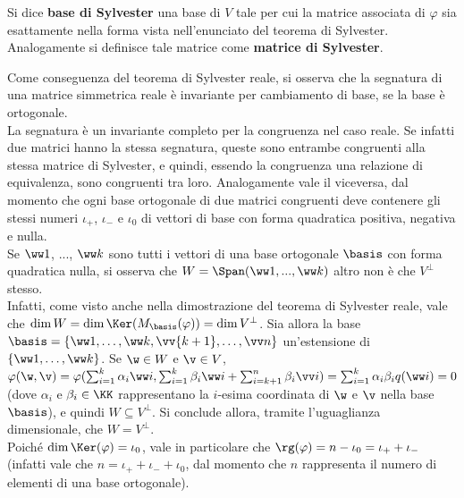 \begin{definition}
	Si dice \textbf{base di Sylvester} una base di $V$ tale per cui la
	matrice associata di $\varphi$ sia esattamente nella forma
	vista nell'enunciato del teorema di Sylvester. Analogamente
	si definisce tale matrice come \textbf{matrice di Sylvester}.
\end{definition}

\begin{remark} \nl
	\li Come conseguenza del teorema di Sylvester reale, si osserva che la segnatura di una matrice simmetrica reale
	è invariante per cambiamento di base, se la base è ortogonale. \\
	
	\li La segnatura è un invariante completo per la congruenza nel caso reale. Se infatti due matrici hanno la stessa segnatura, queste sono
	entrambe congruenti alla stessa matrice di Sylvester, e quindi, essendo
	la congruenza una relazione di equivalenza, sono congruenti
	tra loro. Analogamente vale il viceversa, dal momento che ogni
	base ortogonale di due matrici congruenti deve contenere gli
	stessi numeri $\iota_+$, $\iota_-$ e $\iota_0$ di vettori
	di base con forma quadratica positiva, negativa e nulla. \\
	
	\li Se $\ww 1$, ..., $\ww k$ sono tutti i vettori di una base
	ortogonale $\basis$ con forma quadratica nulla, si osserva che $W = \Span(\ww 1, ..., \ww k)$ altro non è che $V^\perp$ stesso. \\
	
	Infatti, come
	visto anche nella dimostrazione del teorema di Sylvester reale, vale
	che	$\dim W = \dim \Ker (M_\basis(\varphi)) = \dim V^\perp$.
	Sia allora la base $\basis = \{\ww 1, \ldots, \ww k, \vv{k+1}, \ldots, \vv n\}$ un'estensione di $\{\ww 1, \ldots, \ww k\}$. Se $\w \in W$ e $\v \in V$, $\varphi(\w, \v) = \varphi(\sum_{i=1}^k
	\alpha_i \ww i, \sum_{i=1}^k \beta_i \ww i + \sum_{i=k+1}^n \beta_i \vv i)
	= \sum_{i=1}^k \alpha_i \beta_i q(\ww i) = 0$ (dove $\alpha_i$ e $\beta_i \in \KK$ rappresentano la $i$-esima coordinata di $\w$ e $\v$ nella base $\basis$), e quindi
	$W \subseteq V^\perp$. Si conclude allora, tramite l'uguaglianza
	dimensionale, che $W = V^\perp$. \\
	
	\li Poiché $\dim \Ker(\varphi) = \iota_0$, vale in particolare che $\rg(\varphi) = n - \iota_0 = \iota_+ + \iota_-$ (infatti vale che $n = \iota_+ + \iota_- + \iota_0$, dal momento che $n$ rappresenta il numero di elementi di una base ortogonale). \\
	

\end{remark}
